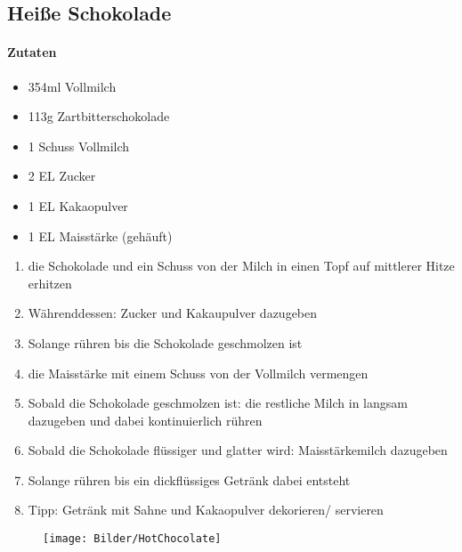 \subsection{Heiße Schokolade}
\paragraph{Zutaten}
\begin{itemize}[noitemsep]
	\item 354ml Vollmilch
	\item 113g Zartbitterschokolade
	\item 1 Schuss Vollmilch
	\item 2 EL Zucker
	\item 1 EL Kakaopulver 
	\item 1 EL Maisstärke (gehäuft) 
\end{itemize}
\begin{enumerate}[noitemsep]
	\item die Schokolade und ein Schuss von der Milch in einen Topf auf mittlerer Hitze erhitzen
	\item Währenddessen: Zucker und Kakaupulver dazugeben 
	\item Solange rühren bis die Schokolade geschmolzen ist 
	\item die Maisstärke mit einem Schuss von der Vollmilch vermengen 
	\item Sobald die Schokolade geschmolzen ist: die restliche Milch in langsam dazugeben und dabei kontinuierlich rühren 
	\item Sobald die Schokolade flüssiger und glatter wird: Maisstärkemilch dazugeben 
	\item Solange rühren bis ein dickflüssiges Getränk dabei entsteht 
	\item Tipp: Getränk mit Sahne und Kakaopulver dekorieren/ servieren
\end{enumerate}
\begin{figure}[h]
\centering
\texttt{[image: Bilder/HotChocolate]}
\end{figure}